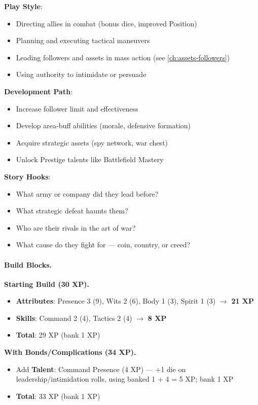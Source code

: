 \textbf{Play Style}:
\begin{itemize}
\item Directing allies in combat (bonus dice, improved Position)
\item Planning and executing tactical maneuvers
\item Leading followers and assets in mass action (see \ref{ch:assets-followers})
\item Using authority to intimidate or persuade
\end{itemize}

\textbf{Development Path}:
\begin{itemize}
\item Increase follower limit and effectiveness
\item Develop area‑buff abilities (morale, defensive formation)
\item Acquire strategic assets (spy network, war chest)
\item Unlock Prestige talents like Battlefield Mastery
\end{itemize}

\textbf{Story Hooks}:
\begin{itemize}
\item What army or company did they lead before?
\item What strategic defeat haunts them?
\item Who are their rivals in the art of war?
\item What cause do they fight for — coin, country, or creed?
\end{itemize}

\paragraph{Build Blocks.}
\textbf{Starting Build (30 XP).}
\begin{itemize}
\item \textbf{Attributes}: Presence 3 (9), Wits 2 (6), Body 1 (3), Spirit 1 (3) $\rightarrow$ \textbf{21 XP}
\item \textbf{Skills}: Command 2 (4), Tactics 2 (4) $\rightarrow$ \textbf{8 XP}
\item \textbf{Total}: 29 XP (bank 1 XP)
\end{itemize}
\textbf{With Bonds/Complications (34 XP).}
\begin{itemize}
\item Add \textbf{Talent}: Command Presence (4 XP) — +1 die on leadership/intimidation rolls, using banked 1 + 4 = 5 XP; bank 1 XP
\item \textbf{Total}: 33 XP (bank 1 XP)
\end{itemize}

